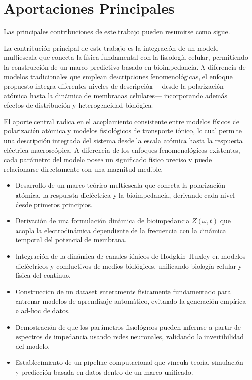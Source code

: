 \documentclass[12pt]{article}
\begin{document}
\section{Aportaciones Principales}

\label{sec:contributions}


Las principales contribuciones de este trabajo pueden resumirse como sigue.

La contribuci\'on principal de este trabajo es la integraci\'on de un modelo
multiescala que conecta la f\'isica fundamental con la fisiolog\'ia celular,
permitiendo la construcci\'on de un marco predictivo basado en bioimpedancia.
A diferencia de modelos tradicionales que emplean descripciones fenomenol\'ogicas,
el enfoque propuesto integra diferentes niveles de descripci\'on ---desde la
polarizaci\'on at\'omica hasta la din\'amica de membranas celulares--- incorporando
adem\'as efectos de distribuci\'on y heterogeneidad biol\'ogica.

El aporte central radica en el acoplamiento consistente entre modelos f\'isicos de polarizaci\'on
at\'omica y modelos fisiol\'ogicos de transporte i\'onico, lo cual permite una descripci\'on
integrada del sistema desde la escala at\'omica hasta la respuesta el\'ectrica macrosc\'opica. A
diferencia de los enfoques fenomenol\'ogicos existentes, cada par\'ametro del modelo posee un
significado f\'isico preciso y puede relacionarse directamente con una magnitud medible.

\begin{itemize}

\item Desarrollo de un marco te\'orico multiescala que conecta la polarizaci\'on at\'omica,
la respuesta diel\'ectrica y la bioimpedancia, derivando cada nivel desde primeros principios.

\item Derivaci\'on de una formulaci\'on din\'amica de bioimpedancia $Z(\omega,t)$ que acopla
la electrodin\'amica dependiente de la frecuencia con la din\'amica temporal del potencial de
membrana.

\item Integraci\'on de la din\'amica de canales i\'onicos de Hodgkin--Huxley en modelos
diel\'ectricos y conductivos de medios biol\'ogicos, unificando biolog\'ia celular y f\'isica
del continuo.

\item Construcci\'on de un dataset enteramente f\'isicamente fundamentado para entrenar
modelos
de aprendizaje autom\'atico, evitando la generaci\'on emp\'irica o ad-hoc de datos.
\item Demostraci\'on de que los par\'ametros fisiol\'ogicos pueden inferirse a partir de
espectros de impedancia usando redes neuronales, validando la invertibilidad del modelo.

\item Establecimiento de un pipeline computacional que vincula teor\'ia, simulaci\'on y
predicci\'on basada en datos dentro de un marco unificado.

\end{itemize}
\end{document}
